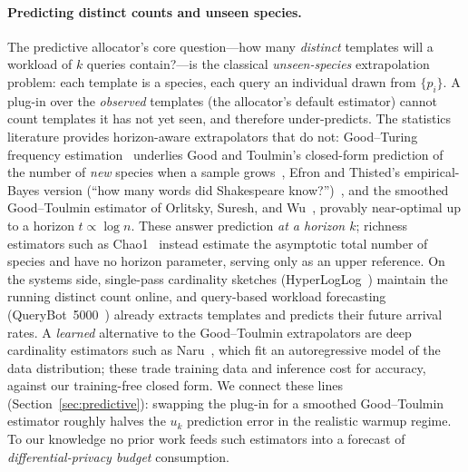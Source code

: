 \documentclass[sigconf,nonacm]{acmart}
\begin{document}
\paragraph{Predicting distinct counts and unseen species.}
The predictive allocator's core question---how many \emph{distinct} templates will a workload of $k$ queries contain?---is the classical \emph{unseen-species} extrapolation problem: each template is a species, each query an individual drawn from $\{p_i\}$. A plug-in over the \emph{observed} templates (the allocator's default estimator) cannot count templates it has not yet seen, and therefore under-predicts. The statistics literature provides horizon-aware extrapolators that do not: Good--Turing frequency estimation~\cite{good1953goodturing} underlies Good and Toulmin's closed-form prediction of the number of \emph{new} species when a sample grows~\cite{goodtoulmin1956}, Efron and Thisted's empirical-Bayes version (``how many words did Shakespeare know?'')~\cite{efronthisted1976}, and the smoothed Good--Toulmin estimator of Orlitsky, Suresh, and Wu~\cite{orlitsky2016unseen}, provably near-optimal up to a horizon $t\propto\log n$. These answer prediction \emph{at a horizon $k$}; richness estimators such as Chao1~\cite{chao1984} instead estimate the asymptotic total number of species and have no horizon parameter, serving only as an upper reference. On the systems side, single-pass cardinality sketches (HyperLogLog~\cite{flajolet2007hll}) maintain the running distinct count online, and query-based workload forecasting (QueryBot~5000~\cite{ma2018qb5000}) already extracts templates and predicts their future arrival rates. A \emph{learned} alternative to the Good--Toulmin extrapolators are deep cardinality estimators such as Naru~\cite{yang2019naru}, which fit an autoregressive model of the data distribution; these trade training data and inference cost for accuracy, against our training-free closed form. We connect these lines (Section~\ref{sec:predictive}): swapping the plug-in for a smoothed Good--Toulmin estimator roughly halves the $u_k$ prediction error in the realistic warmup regime. To our knowledge no prior work feeds such estimators into a forecast of \emph{differential-privacy budget} consumption.
\end{document}
